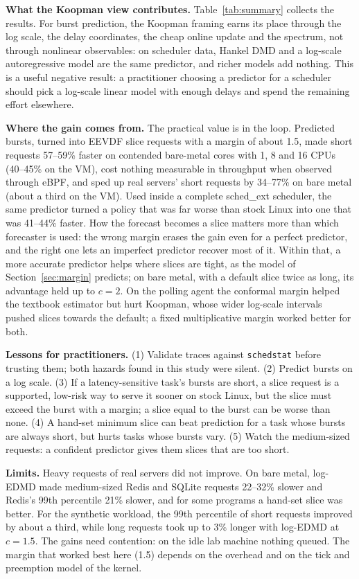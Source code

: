 \documentclass[conference,onecolumn,11pt]{IEEEtran}
\begin{document}
\textbf{What the Koopman view contributes.} Table~\ref{tab:summary} collects the results. For burst prediction, the Koopman framing earns its place through the log scale, the delay coordinates, the cheap online update and the spectrum, not through nonlinear observables: on scheduler data, Hankel DMD and a log-scale autoregressive model are the same predictor, and richer models add nothing. This is a useful negative result: a practitioner choosing a predictor for a scheduler should pick a log-scale linear model with enough delays and spend the remaining effort elsewhere.

\textbf{Where the gain comes from.} The practical value is in the loop. Predicted bursts, turned into EEVDF slice requests with a margin of about 1.5, made short requests 57--59\% faster on contended bare-metal cores with 1, 8 and 16 CPUs (40--45\% on the VM), cost nothing measurable in throughput when observed through eBPF, and sped up real servers' short requests by 34--77\% on bare metal (about a third on the VM). Used inside a complete sched\_ext scheduler, the same predictor turned a policy that was far worse than stock Linux into one that was 41--44\% faster. How the forecast becomes a slice matters more than which forecaster is used: the wrong margin erases the gain even for a perfect predictor, and the right one lets an imperfect predictor recover most of it. Within that, a more accurate predictor helps where slices are tight, as the model of Section~\ref{sec:margin} predicts; on bare metal, with a default slice twice as long, its advantage held up to $c=2$. On the polling agent the conformal margin helped the textbook estimator but hurt Koopman, whose wider log-scale intervals pushed slices towards the default; a fixed multiplicative margin worked better for both.

\textbf{Lessons for practitioners.} (1) Validate traces against \texttt{schedstat} before trusting them; both hazards found in this study were silent. (2) Predict bursts on a log scale. (3) If a latency-sensitive task's bursts are short, a slice request is a supported, low-risk way to serve it sooner on stock Linux, but the slice must exceed the burst with a margin; a slice equal to the burst can be worse than none. (4) A hand-set minimum slice can beat prediction for a task whose bursts are always short, but hurts tasks whose bursts vary. (5) Watch the medium-sized requests: a confident predictor gives them slices that are too short.

\textbf{Limits.} Heavy requests of real servers did not improve. On bare metal, log-EDMD made medium-sized Redis and SQLite requests 22--32\% slower and Redis's 99th percentile 21\% slower, and for some programs a hand-set slice was better. For the synthetic workload, the 99th percentile of short requests improved by about a third, while long requests took up to 3\% longer with log-EDMD at $c=1.5$. The gains need contention: on the idle lab machine nothing queued. The margin that worked best here (1.5) depends on the overhead and on the tick and preemption model of the kernel.
\end{document}
